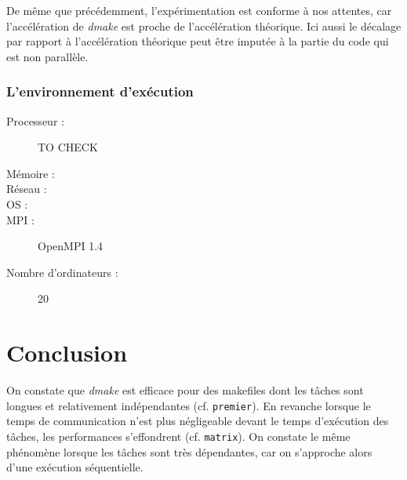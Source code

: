 \documentclass[a4paper,12pt,twoside]{article}
\begin{document}
De même que précédemment, l'expérimentation est conforme à nos attentes, car
l'accélération de \emph{dmake} est proche de l'accélération
théorique. Ici aussi le décalage par rapport à l'accélération théorique peut
être imputée à la partie du code qui est non parallèle. 

\subsubsection{L'environnement d'exécution}
\begin{description}
\item[Processeur :] TO CHECK
\item[Mémoire :]
\item[Réseau :]
\item[OS :]
\item[MPI :] OpenMPI 1.4
\item[Nombre d’ordinateurs :] 20
\end{description}

\section*{Conclusion}
On constate que \emph{dmake} est efficace pour des makefiles dont les
tâches sont longues et relativement indépendantes
(cf. \texttt{premier}). En revanche lorsque le temps de communication
n'est plus négligeable devant le temps d'exécution des tâches, les
performances s'effondrent (cf. \texttt{matrix}). On constate le même phénomène lorsque les
tâches sont très dépendantes, car on s'approche alors d'une exécution séquentielle.
\end{document}
